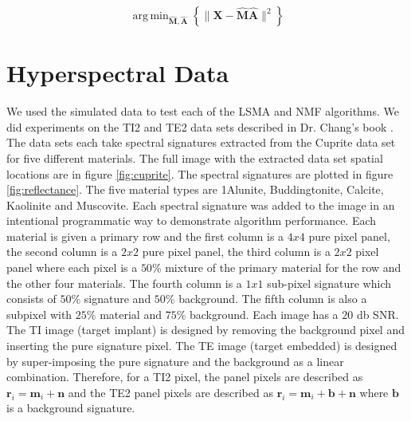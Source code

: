 \documentclass[journal]{IEEEtran}
\DeclareMathOperator*{\argmin}{arg\,min}
\begin{document}
\begin{equation}
\label{eq:mse}
\argmin_{\mathbf{\hat{M}},\mathbf{\hat{A}}}\left\{\|\mathbf{X} - \mathbf{\hat{M}}\mathbf{\hat{A}}\|^2\right\}
\end{equation}

\section{Hyperspectral Data}
We used the simulated data to test each of the LSMA and NMF algorithms. We did experiments on the TI2 and TE2 data sets described in Dr. Chang's book \cite{changbook2}. The data sets each take spectral signatures extracted from the Cuprite data set for five different materials. The full image with the extracted data set spatial locations are in figure \ref{fig:cuprite}. The spectral signatures are plotted in figure \ref{fig:reflectance}. The five material types are  1Alunite, Buddingtonite, Calcite, Kaolinite and Muscovite. Each spectral signature was added to the image in an intentional programmatic way to demonstrate algorithm performance. Each material is given a primary row and the first column is a \(4x4\) pure pixel panel, the second column is a \(2x2\) pure pixel panel, the third column is a \(2x2\) pixel panel where each pixel is a \(50\)\% mixture of the primary material for the row and the other four materials. The fourth column is a \(1x1\) sub-pixel signature which consists of \(50\)\% signature and \(50\)\% background. The fifth column is also a subpixel with \(25\)\% material and \(75\)\% background. Each image has a \(20\) db SNR. The TI image (target implant) is designed by removing the background pixel and inserting the pure signature pixel. The TE image (target embedded) is designed by super-imposing the pure signature and the background as a linear combination. Therefore, for a TI2 pixel, the panel pixels are described as \(\mathbf{r}_i=\mathbf{m}_i+\mathbf{n}\) and the TE2 panel pixels are described as \(\mathbf{r}_i=\mathbf{m}_i+\mathbf{b}+\mathbf{n}\) where \(\mathbf{b}\) is a background signature.
\end{document}
